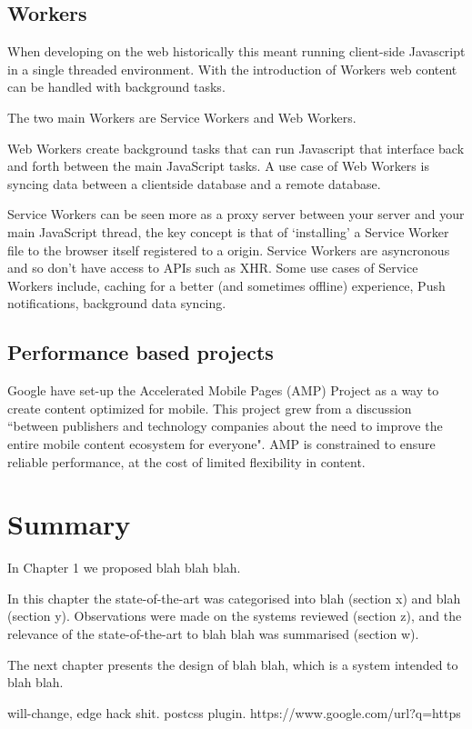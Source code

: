 \subsection{Workers}

When developing on the web historically this meant running client-side Javascript in a single threaded environment. With the introduction of Workers web content can be handled with background tasks.

The two main Workers are Service Workers and Web Workers.

Web Workers create background tasks that can run Javascript that interface back and forth between the main JavaScript tasks. A use case of Web Workers is syncing data between a clientside database and a remote database. \cite{using_web_workers}

Service Workers can be seen more as a proxy server between your server and your main JavaScript thread, the key concept is that of `installing' a Service Worker file to the browser itself registered to a origin. Service Workers are asyncronous and so don't have access to APIs such as XHR.
Some use cases of Service Workers include, caching for a better (and sometimes offline) experience, Push notifications, background data syncing. \cite{service_worker}

\subsection{Performance based projects}

Google have set-up the Accelerated Mobile Pages (AMP) Project as a way to create content optimized for mobile. This project grew from a discussion ``between publishers and technology companies about the need to improve the entire mobile content ecosystem for everyone". AMP is constrained to ensure reliable performance, at the cost of limited flexibility in content. \cite{intro_to_amp}

\section{Summary} \label{l-r--summary}

In Chapter 1 we proposed blah blah blah.

In this chapter the state-of-the-art was categorised into blah (section x) and  blah (section y).  Observations were made on the systems reviewed (section z), and the relevance of the state-of-the-art to blah blah was summarised (section w).

The next chapter presents the design of blah blah, which is a system intended to blah blah.

will-change, edge hack shit. postcss plugin. https://www.google.com/url?q=https%
